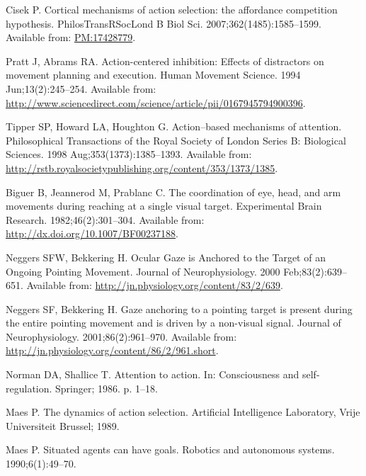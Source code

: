 \documentclass[10pt,letterpaper]{article}
\begin{document}
\begin{thebibliography}{10}

Cisek P.
\newblock Cortical mechanisms of action selection: the affordance competition
  hypothesis.
\newblock PhilosTransRSocLond B Biol Sci. 2007;362(1485):1585--1599.
\newblock Available from: \url{PM:17428779}.

Pratt J, Abrams RA.
\newblock Action-centered inhibition: {Effects} of distractors on movement
  planning and execution.
\newblock Human Movement Science. 1994 Jun;13(2):245--254.
\newblock Available from:
  \url{http://www.sciencedirect.com/science/article/pii/0167945794900396}.

Tipper SP, Howard LA, Houghton G.
\newblock Action–based mechanisms of attention.
\newblock Philosophical Transactions of the Royal Society of London Series B:
  Biological Sciences. 1998 Aug;353(1373):1385--1393.
\newblock Available from:
  \url{http://rstb.royalsocietypublishing.org/content/353/1373/1385}.

Biguer B, Jeannerod M, Prablanc C.
\newblock The coordination of eye, head, and arm movements during reaching at a
  single visual target.
\newblock Experimental Brain Research. 1982;46(2):301--304.
\newblock Available from: \url{http://dx.doi.org/10.1007/BF00237188}.

Neggers SFW, Bekkering H.
\newblock Ocular {Gaze} is {Anchored} to the {Target} of an {Ongoing}
  {Pointing} {Movement}.
\newblock Journal of Neurophysiology. 2000 Feb;83(2):639--651.
\newblock Available from: \url{http://jn.physiology.org/content/83/2/639}.

Neggers SF, Bekkering H.
\newblock Gaze anchoring to a pointing target is present during the entire
  pointing movement and is driven by a non-visual signal.
\newblock Journal of Neurophysiology. 2001;86(2):961--970.
\newblock Available from:
  \url{http://jn.physiology.org/content/86/2/961.short}.

Norman DA, Shallice T.
\newblock Attention to action.
\newblock In: Consciousness and self-regulation. Springer; 1986. p. 1--18.

Maes P.
\newblock The dynamics of action selection.
\newblock Artificial Intelligence Laboratory, Vrije Universiteit Brussel; 1989.

Maes P.
\newblock Situated agents can have goals.
\newblock Robotics and autonomous systems. 1990;6(1):49--70.


\end{thebibliography}
\end{document}
